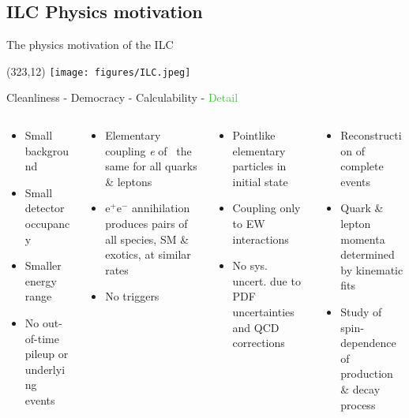 \documentclass[xcolor={dvipsnames}]{beamer}
\newcommand{\ilclogo}{
  \setlength{\TPHorizModule}{1pt}
  \setlength{\TPVertModule}{1pt}
  \begin{textblock}{1}(323,12)
   \texttt{[image: figures/ILC.jpeg]}
  \end{textblock}
}
\begin{document}
\subsection{ILC Physics motivation}
\begin{frame}[fragile]{The physics motivation of the ILC}
\ilclogo

\begin{block}{}
\centering
\textcolor{JungleGreen}{Cleanliness} - \textcolor{WildStrawberry}{Democracy} - \textcolor{Periwinkle}{Calculability} - \textcolor{LimeGreen}{Detail}
\end{block}

\begin{columns}
\begin{column}{0.24\textwidth}
\begin{itemize}
\color{JungleGreen}
\item Small background
\item Small detector occupancy
\item Smaller energy range
\item No out-of-time pileup or underlying events
\end{itemize}
\end{column}
\begin{column}{0.26\textwidth}
\begin{itemize}
\color{WildStrawberry}
\item Elementary coupling \textit{e} of \textgamma \, the same for all quarks \& leptons
\item e$^+$e$^-$ annihilation produces pairs of all species, SM \& exotics, at similar rates
\item No triggers
\end{itemize}
\end{column}
\begin{column}{0.27\textwidth}
\begin{itemize}
\color{Periwinkle}
\item Pointlike elementary particles in initial state
\item Coupling only to EW interactions
\item No sys. uncert. due to PDF uncertainties and QCD corrections
\end{itemize}
\end{column}
\begin{column}{0.27\textwidth}
\begin{itemize}
\color{LimeGreen}
\item Reconstruction of complete events
\item Quark \& lepton momenta determined by kinematic fits
\item Study of spin-dependence of production \& decay process
\end{itemize}
\end{column}
\end{columns}

\end{frame}
\end{document}
